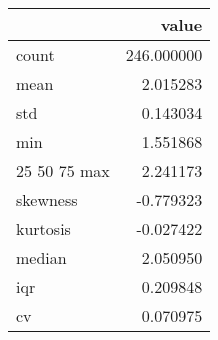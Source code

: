 \begin{tabular}{lr}
\toprule
 & value \\
\midrule
count & 246.000000 \\
mean & 2.015283 \\
std & 0.143034 \\
min & 1.551868 \\
25%
50%
75%
max & 2.241173 \\
skewness & -0.779323 \\
kurtosis & -0.027422 \\
median & 2.050950 \\
iqr & 0.209848 \\
cv & 0.070975 \\
\bottomrule
\end{tabular}

